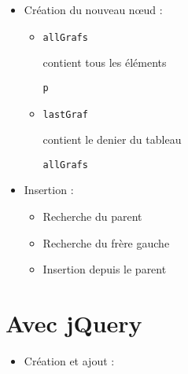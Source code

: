 \begin{itemize}
\tightlist
\item
  Création du nouveau nœud :

  \begin{itemize}
  \tightlist
  \item
    \begin{otherlanguage}{english}\texttt{allGrafs}\end{otherlanguage}
    contient tous les éléments
    \begin{otherlanguage}{english}\texttt{p}\end{otherlanguage}
  \item
    \begin{otherlanguage}{english}\texttt{lastGraf}\end{otherlanguage}
    contient le denier du tableau
    \begin{otherlanguage}{english}\texttt{allGrafs}\end{otherlanguage}
  \end{itemize}
\item
  Insertion :

  \begin{itemize}
  \tightlist
  \item
    Recherche du parent
  \item
    Recherche du frère gauche
  \item
    Insertion depuis le parent
  \end{itemize}
\end{itemize}

\hypertarget{avec-jquery}{%
\section{Avec jQuery}\label{avec-jquery}}

\begin{itemize}
\tightlist
\item
  Création et ajout :
\end{itemize}

\begin{otherlanguage}{english}

\begin{Shaded}
\begin{Highlighting}[]
    \OperatorTok{=} \AttributeTok{$}\NormalTok{(}\NormalTok{)}\OperatorTok{;}  
    \AttributeTok{$}\NormalTok{(}\OperatorTok{;}                
\end{Highlighting}
\end{Shaded}

\end{otherlanguage}

